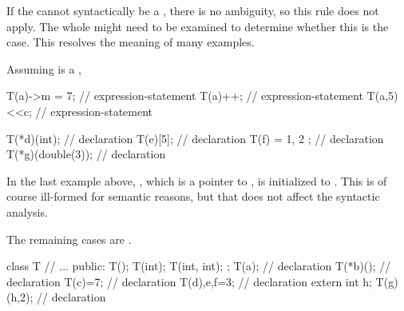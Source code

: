\pnum
\begin{note}
If the  cannot syntactically be a
, there is no ambiguity,
so this rule does not apply.
The whole  might need to be examined
to determine whether this is the case. This resolves the meaning
of many examples.
\begin{example}
Assuming  is a
,

\begin{codeblock}
T(a)->m = 7;        // expression-statement
T(a)++;             // expression-statement
T(a,5)<<c;          // expression-statement

T(*d)(int);         //  declaration
T(e)[5];            //  declaration
T(f) = { 1, 2 };    //  declaration
T(*g)(double(3));   //  declaration
\end{codeblock}

In the last example above, , which is a pointer to ,
is initialized to . This is of course ill-formed for
semantic reasons, but that does not affect the syntactic analysis.
\end{example}

The remaining cases are .
\begin{example}
\begin{codeblock}
class T {
  // ...
public:
  T();
  T(int);
  T(int, int);
};
T(a);               //  declaration
T(*b)();            //  declaration
T(c)=7;             //  declaration
T(d),e,f=3;         //  declaration
extern int h;
T(g)(h,2);          //  declaration
\end{codeblock}
\end{example}
\end{note}

